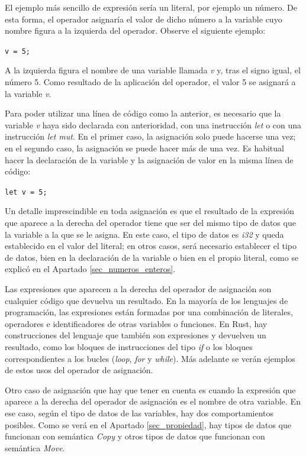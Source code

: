 El ejemplo más sencillo de expresión sería un literal, por ejemplo un número. De esta forma, el operador asignaría el valor de dicho número a la variable cuyo nombre figura a la izquierda del operador. Observe el siguiente ejemplo:

{\centering \texttt{v = 5;} \par}

A la izquierda figura el nombre de una variable llamada \textit{v} y, tras el signo igual, el número 5. Como resultado de la aplicación del operador, el valor 5 se asignará a la variable \textit{v}. 



Para poder utilizar una línea de código como la anterior, es necesario que la variable \textit{v} haya sido declarada con anterioridad, con una instrucción \textit{let} o con una instrucción \textit{let mut}. En el primer caso, la asignación solo puede hacerse una vez; en el segundo caso, la asignación se puede hacer más de una vez. Es habitual hacer la declaración de la variable y la asignación de valor en la misma línea de código:

{\centering \texttt{let v = 5;} \par}

Un detalle imprescindible en toda asignación es que el resultado de la expresión que aparece a la derecha del operador tiene que ser del mismo tipo de datos que la variable a la que se le asigna. En este caso, el tipo de datos es \textit{i32} y queda establecido en el valor del literal; en  otros casos, será necesario establecer el tipo de datos, bien en la declaración de la variable o bien en el propio literal, como se explicó en el Apartado \ref{sec_numeros_enteros}.

Las expresiones que aparecen a la derecha del operador de asignación son cualquier código que devuelva un resultado. En la mayoría de los lenguajes de programación, las expresiones están formadas por una combinación de literales, operadores e identificadores de otras variables o funciones. En Rust, hay construcciones del lenguaje que también son expresiones y devuelven un resultado, como los bloques de instrucciones del tipo \textit{if} o los bloques correspondientes a los bucles (\textit{loop}, \textit{for} y \textit{while}). Más adelante se verán ejemplos de estos usos del operador de asignación.

Otro caso de asignación que hay que tener en cuenta es cuando la expresión que aparece a la derecha del operador de asignación es el nombre de otra variable. En ese caso, según el tipo de datos de las variables, hay dos comportamientos posibles. Como se verá en el Apartado \ref{sec_propiedad}, hay tipos de datos que funcionan con semántica \textit{Copy} y otros tipos de datos que funcionan con semántica \textit{Move}. 

